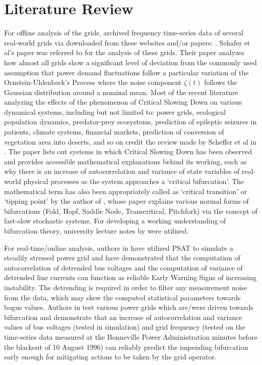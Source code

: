\section[Literature Review]{Literature Review}
\label{sec:litt}

For offline analysis of the grids, archived frequency time-series data of several real-world grids via downloaded from these websites and/or papers: \cite{lrydin01, lrydinGithub, ce2019, ce2020, tokyo2017, tokyo2020, nordic2018, nordic2019, ukNationalGridESOData}. Schafer et al's paper \cite{schafer01} was referred to for the analysis of these grids. Their paper  analyzes how almost all grids show a significant level of deviation from the commonly used assumption that power demand fluctuations follow a particular variation of the Ornstein-Uhlenbeck's Process where the noise component $\zeta(t)$ follows the Gaussian distribution around a nominal mean.
Most of the recent literature analyzing the effects of the phenomenon of Critical Slowing Down on various dynamical systems, including but not limited to: power grids, ecological population dynamics, predator-prey ecosystems, prediction of epileptic seizures in patients, climate systems, financial markets, prediction of conversion of vegetation area into deserts, and so on credit the review made by Scheffer et al in \cite{schefferEarlyWarningSignalsForCriticalTransitions}. The paper lists out systems in which Critical Slowing Down has been observed and provides accessible mathematical explanations behind its working, such as why there is an increase of autocorrelation and variance of state variables of real-world physical processes as the system approaches a `critical bifurcation'. The mathematical term has also been appropriately called as `critical transition' or `tipping point' by the author of \cite{kuehnMathematicalFrameworkForCriticalTransitions}, whose paper explains various normal forms of bifurcations (Fold, Hopf, Saddle Node, Transcritical, Pitchfork) via the concept of fast-slow stochastic systems. For developing a working understanding of bifurcation theory, university lecture notes by \cite{nathanKutzNotesOnBifurcationTheoryAndNormalForms} were utilized.  

For real-time/online analysis, authors in \cite{ghanvati01} have utilized PSAT to simulate a steadily stressed power grid and have demonstrated that the computation of autocorrelation of detrended bus voltages and the computation  of variance of detrended line currents can function as reliable Early Warning Signs of increasing instability. The detrending is required in order to filter any measurement noise from the data, which may skew the computed statistical parameters towards bogus values. Authors in \cite{sanchez01} test various power grids which are/were driven towards bifurcation and demonstrate that an increase of autocorrelation and variance values of bus voltages (tested in simulation) and grid frequency (tested on the time-series data measured at the Bonneville Power Administration minutes before the blackout of 10 August 1996) can reliably predict the impending bifurcation early enough for mitigating actions to be taken by the grid operator.